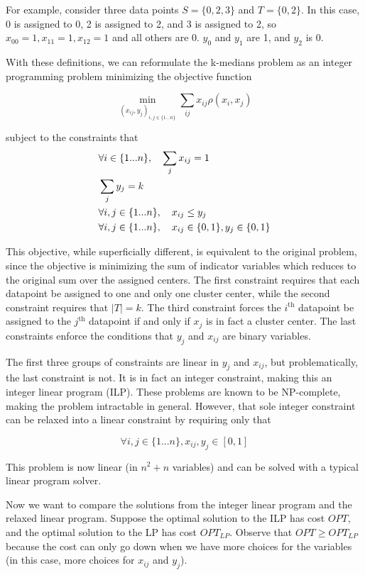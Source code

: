 \begin{example}
	For example, consider three data points $S=\{0, 2, 3\}$ and
	$T=\{0, 2\}$. In this case, 0 is assigned to 0, 2 is assigned to 2, and 3 is assigned to 2,
	so $x_{00} = 1, x_{11}=1, x_{12}=1$ and all others are 0. $y_0$ and $y_1$ are 1, and $y_2$ is 0.
\end{example}

With these definitions, we can reformulate the k-medians problem as 
an integer programming problem minimizing the objective function

$$\min_{(x_{ij}, y_j)_{i, j \in \{1...n\}}} \sum_{ij} x_{ij}\rho(x_i, x_j)$$

subject to the constraints that
\begin{align}
	& \forall i \in \{1...n\}, \quad\sum_j x_{ij} = 1 \notag \\
	& \sum_j y_j = k \notag \\ 
	& \forall i, j \in \{1...n\},  \quad x_{ij} \leq y_j \notag \\
	& \forall i, j \in \{1...n\},  \quad x_{ij}\in \{0, 1\}, y_j\in\{0, 1\} \notag
\end{align}

This objective, while superficially different, is equivalent to the original problem, 
since the objective is minimizing the sum of indicator variables which reduces
to the original sum over the assigned centers. The first constraint requires that 
each datapoint be assigned to one and only one cluster center, while the second 
constraint requires that $|T|=k$. The third constraint forces the $i^\text{th}$ 
datapoint be assigned to the $j^\text{th}$ datapoint if and only if $x_j$ is in fact
a cluster center. The last constraints enforce the conditions that $y_j$ and $x_{ij}$
are binary variables. 

The first three groups of constraints are linear in $y_j$ and $x_{ij}$, but problematically, the last constraint is not.
It is in fact an integer constraint, making this an integer linear program (ILP). These problems are known to be NP-complete, making the problem intractable in general. However, that sole integer
constraint can be relaxed into a linear constraint by requiring only that

$$\forall i, j \in \{1...n\}, x_{ij}, y_j \in[0, 1]$$

This problem is now linear (in $n^2 + n$ variables) and can be solved with a typical linear program solver.

Now we want to compare the solutions from the integer linear program and the relaxed linear program. Suppose the optimal solution to the ILP has cost $OPT$, and the optimal solution to the LP has cost $OPT_{LP}$. Observe that $OPT \geq OPT_{LP}$ because the cost can only go down when we have more choices for the variables (in this case, more choices for $x_{ij}$ and $y_j$). \\

